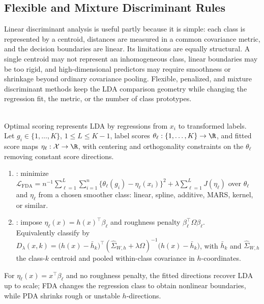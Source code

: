 \subsection{Flexible and Mixture Discriminant Rules}

Linear discriminant analysis is useful partly because it is simple: each class is represented by a centroid, distances are measured in a common covariance metric, and the decision boundaries are linear.  Its limitations are equally structural.  A single centroid may not represent an inhomogeneous class, linear boundaries may be too rigid, and high-dimensional predictors may require smoothness or shrinkage beyond ordinary covariance pooling.  Flexible, penalized, and mixture discriminant methods keep the LDA comparison geometry while changing the regression fit, the metric, or the number of class prototypes.

\begin{method} \label{meth:sl-flexible-penalized-discriminant-analysis} \\
Optimal scoring represents LDA by regressions from $x_i$ to transformed labels.\\
Let $g_i\in\{1,\ldots,K\}$, $1\leq L\leq K-1$, label scores $\theta_\ell:\{1,\ldots,K\}\to\R$, and fitted score maps $\eta_\ell:\mathcal{X}\to\R$, with centering and orthogonality constraints on the $\theta_\ell$ removing constant score directions.
\begin{enumerate}[label=(\roman*)]
\setlength{\itemsep}{0pt}
\item {}: minimize $\mathcal{L}_{\mathrm{FDA}}=n^{-1}\sum\limits_{\ell=1}^{L}\sum\limits_{i=1}^{n}\{\theta_\ell(g_i)-\eta_\ell(x_i)\}^2+\lambda\sum\limits_{\ell=1}^{L}J(\eta_\ell)$ over $\theta_\ell$ and $\eta_\ell$ from a chosen smoother class: linear, spline, additive, MARS, kernel, or similar.
\item {}: impose $\eta_\ell(x)=h(x)^\top\beta_\ell$ and roughness penalty $\beta_\ell^\top\Omega\beta_\ell$.\\
Equivalently classify by $D_\lambda(x,k)=\bigl(h(x)-\bar{h}_k\bigr)^\top(\widehat{\Sigma}_{W,h}+\lambda\Omega)^{-1}\bigl(h(x)-\bar{h}_k\bigr)$, with $\bar{h}_k$ and $\widehat{\Sigma}_{W,h}$ the class-$k$ centroid and pooled within-class covariance in $h$-coordinates.
\end{enumerate}
For $\eta_\ell(x)=x^\top\beta_\ell$ and no roughness penalty, the fitted directions recover LDA up to scale; FDA changes the regression class to obtain nonlinear boundaries, while PDA shrinks rough or unstable $h$-directions.
\end{method}

